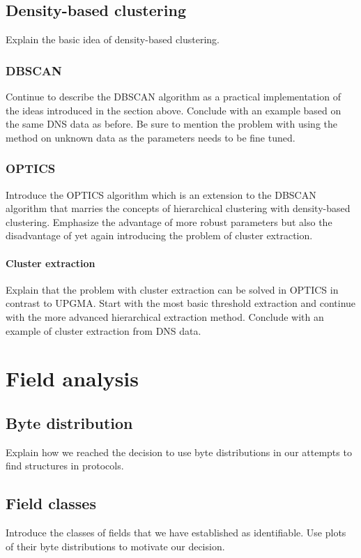 \documentclass[a4paper]{report}
\begin{document}
\subsection{Density-based clustering}
Explain the basic idea of density-based clustering.

\subsubsection{DBSCAN}
Continue to describe the DBSCAN algorithm as a practical implementation of the
ideas introduced in the section above. Conclude with an example based on the
same DNS data as before. Be sure to mention the problem with using the method
on unknown data as the parameters needs to be fine tuned.

\subsubsection{OPTICS}
Introduce the OPTICS algorithm which is an extension to the DBSCAN algorithm
that marries the concepts of hierarchical clustering with density-based
clustering. Emphasize the advantage of more robust parameters but also the
disadvantage of yet again introducing the problem of cluster extraction.

\paragraph{Cluster extraction}
Explain that the problem with cluster extraction can be solved in OPTICS in
contrast to UPGMA. Start with the most basic threshold extraction and continue
with the more advanced hierarchical extraction method. Conclude with an example
of cluster extraction from DNS data.

\section{Field analysis}

\subsection{Byte distribution}
Explain how we reached the decision to use byte distributions in our attempts
to find structures in protocols.

\subsection{Field classes}
Introduce the classes of fields that we have established as identifiable. Use
plots of their byte distributions to motivate our decision.
\end{document}

